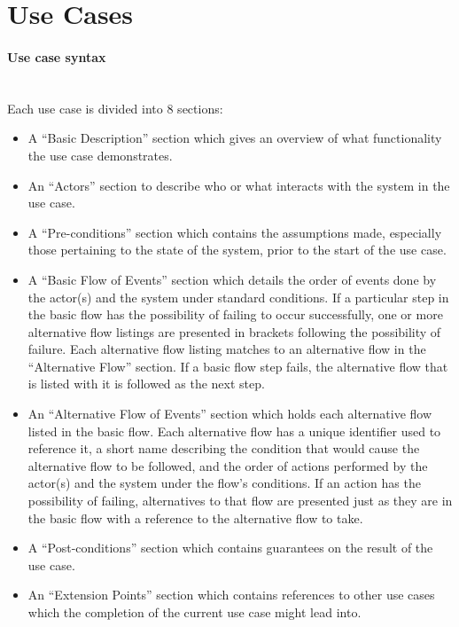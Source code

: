 \documentclass{article}
\begin{document}
\section{Use Cases}
\label{use_case}

\paragraph{Use case syntax}
~\\
Each use case is divided into 8 sections:
\begin{itemize}
\item A ``Basic Description'' section which gives an overview of what functionality the use case demonstrates.
\item An ``Actors'' section to describe who or what interacts with the system in the use case.
\item A ``Pre-conditions'' section which contains the assumptions made, especially those pertaining to the state of the system, prior to the start of the use case.\label{pre_cond}
\item A ``Basic Flow of Events'' section which details the order of events done by the actor(s) and the system under standard conditions. If a particular step in the basic flow has the possibility of failing to occur successfully, one or more alternative flow listings are presented in brackets following the possibility of failure. Each alternative flow listing matches to an alternative flow in the ``Alternative Flow'' section. If a basic flow step fails, the alternative flow that is listed with it is followed as the next step.
\item An ``Alternative Flow of Events'' section which holds each alternative flow listed in the basic flow. Each alternative flow has a unique identifier used to reference it, a short name describing the condition that would cause the alternative flow to be followed, and the order of actions performed by the actor(s) and the system under the flow's conditions. If an action has the possibility of failing, alternatives to that flow are presented just as they are in the basic flow with a reference to the alternative flow to take.
\item A ``Post-conditions'' section which contains guarantees on the result of the use case.\label{post_cond}
\item An ``Extension Points'' section which contains references to other use cases which the completion of the current use case might lead into.
\end{itemize}
\end{document}
